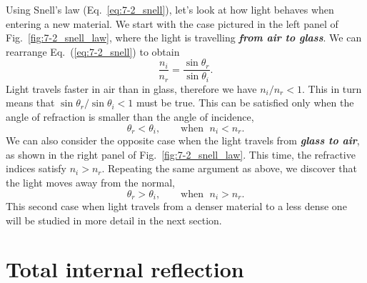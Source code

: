 Using Snell's law (Eq.~\ref{eq:7-2_snell}), let's look at how light behaves when entering a new material.
We start with the case pictured in the left panel of Fig.~\ref{fig:7-2_snell_law}, where the light is travelling \textit{\textbf{from air to glass}}.
We can rearrange Eq.~(\ref{eq:7-2_snell}) to obtain
\begin{equation}
    \frac{n_i}{n_r} = \frac{\sin\theta_r}{\sin\theta_i}.
\end{equation}
Light travels faster in air than in glass, therefore we have $n_i / n_r < 1$.
This in turn means that $\sin\theta_r / \sin\theta_i < 1$ must be true.
This can be satisfied only when the angle of refraction is smaller than the angle of incidence,
\begin{equation}
    \theta_r < \theta_i, \qquad \text{when } \; n_i < n_r.
\end{equation}
We can also consider the opposite case when the light travels from \textit{\textbf{glass to air}}, as shown in the right panel of Fig.~\ref{fig:7-2_snell_law}.
This time, the refractive indices satisfy $n_i > n_r$.
Repeating the same argument as above, we discover that the light moves away from the normal,
\begin{equation}
    \theta_r > \theta_i, \qquad \text{when } \; n_i > n_r.
\end{equation}
This second case when light travels from a denser material to a less dense one will be studied in more detail in the next section.

\section{Total internal reflection}
\label{sec:7-3_total_internal_reflection}

